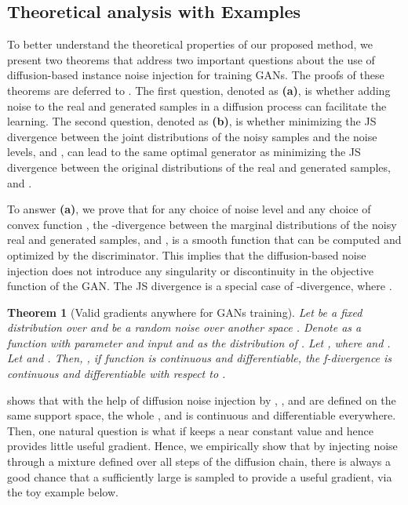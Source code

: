 \documentclass{article} \usepackage{iclr2023_conference,times}
\theoremstyle{plain}
\newtheorem{theorem}{Theorem} \newtheorem{proposition}[theorem]{Proposition}
\theoremstyle{definition}
\theoremstyle{remark}
\begin{document}
\subsection{Theoretical analysis with Examples} 
\label{sec:theory}



To better understand the theoretical properties of our proposed method, we present two theorems that address two important questions about the use of diffusion-based instance noise injection for training GANs. The proofs of these theorems are deferred to . The first question, denoted as \textbf{(a)}, is whether adding noise to the real and generated samples in a diffusion process can facilitate the learning.
The second question, denoted as \textbf{(b)}, is whether minimizing the JS divergence between the joint distributions of the noisy samples and the noise levels,  and , can lead to the same optimal generator as minimizing the JS divergence between the original distributions of the real and generated samples,  and . 

To answer \textbf{(a)}, we prove that for any choice of noise level  and any choice of convex function , the -divergence \citep{nowozin2016f-gan} between the marginal distributions of the noisy real and generated samples,  and , is a smooth function that can be computed and optimized by the discriminator. This implies that the diffusion-based noise injection does not introduce any singularity or discontinuity in the objective function of the GAN. The JS divergence is a special case of -divergence, where .


\begin{theorem}[Valid gradients anywhere for GANs training] \label{theorem:d-jsd}
Let  be a fixed distribution over  and  be a random noise over another space . Denote  as a function with parameter  and input  and   as the distribution of . Let , where  and .
Let  and . Then, , if function  is continuous and differentiable,  the f-divergence  is continuous and differentiable with respect to . 
\end{theorem}

 shows that with the help of diffusion noise injection by , ,  and  are defined on the same support space, the whole , and  is continuous and differentiable everywhere. Then, one natural question is what if  keeps a near constant value and hence provides little useful gradient. 
Hence, we empirically show that by injecting noise through a mixture defined over all steps of the diffusion chain, there is always a good chance that a sufficiently large  is sampled to provide a useful gradient, via the toy example below. 
\end{document}
